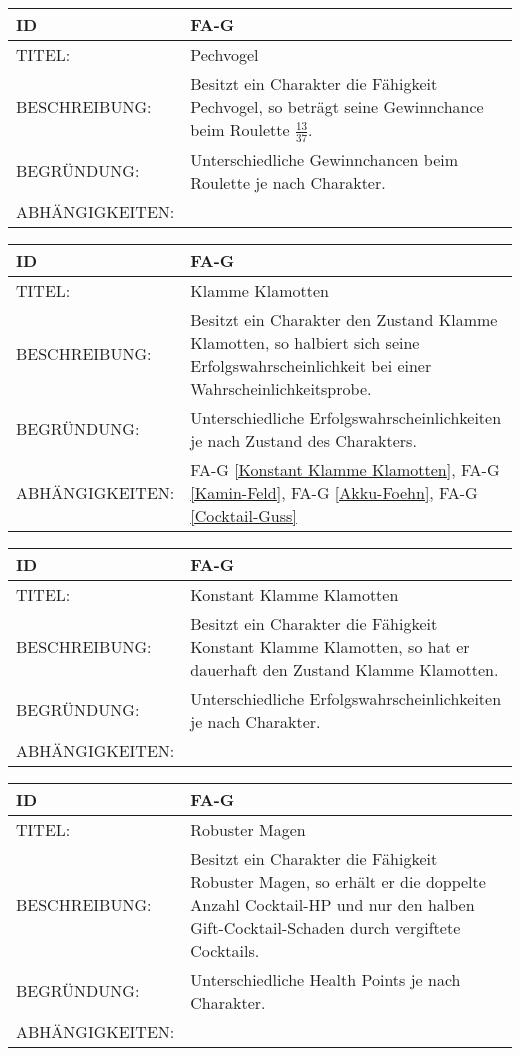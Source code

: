 \begin{tabularx}{16cm}{l|X}
	{table}\label{Pechvogel}
	\textbf{ID} & \textbf{FA-G \arabic{table}} \\
	\hline
	TITEL: & Pechvogel \\
	\hline
	BESCHREIBUNG: & Besitzt ein Charakter die Fähigkeit Pechvogel, so beträgt seine Gewinnchance beim Roulette $\frac{13}{37}$.\\
	\hline
	BEGRÜNDUNG: & Unterschiedliche Gewinnchancen beim Roulette je nach Charakter. \\
	\hline
	ABHÄNGIGKEITEN: &\\
\end{tabularx}

\begin{tabularx}{16cm}{l|X}
	{table}\label{Klamme Klamotten}
	\textbf{ID} & \textbf{FA-G \arabic{table}} \\
	\hline
	TITEL: & Klamme Klamotten \\
	\hline
	BESCHREIBUNG: & Besitzt ein Charakter den Zustand Klamme Klamotten, so halbiert sich seine Erfolgswahrscheinlichkeit bei einer Wahrscheinlichkeitsprobe. \\
	\hline
	BEGRÜNDUNG: & Unterschiedliche Erfolgswahrscheinlichkeiten je nach Zustand des Charakters.\\
	\hline
	ABHÄNGIGKEITEN: & FA-G \ref{Konstant Klamme Klamotten}, FA-G \ref{Kamin-Feld}, FA-G \ref{Akku-Foehn},  FA-G \ref{Cocktail-Guss}\\
\end{tabularx}

\begin{tabularx}{16cm}{l|X}
	{table}\label{Konstant Klamme Klamotten}
	\textbf{ID} & \textbf{FA-G \arabic{table}} \\
	\hline
	TITEL: & Konstant Klamme Klamotten \\
	\hline
	BESCHREIBUNG: & Besitzt ein Charakter die Fähigkeit Konstant Klamme Klamotten, so hat er dauerhaft den Zustand Klamme Klamotten.\\
	\hline
	BEGRÜNDUNG: & Unterschiedliche Erfolgswahrscheinlichkeiten je nach Charakter.\\
	\hline
	ABHÄNGIGKEITEN: & \\
\end{tabularx}

\begin{tabularx}{16cm}{l|X}
	{table}\label{Robuster Magen}
	\textbf{ID} & \textbf{FA-G \arabic{table}} \\
	\hline
	TITEL: & Robuster Magen \\
	\hline
	BESCHREIBUNG: & Besitzt ein Charakter die Fähigkeit Robuster Magen, so erhält er die doppelte Anzahl Cocktail-HP und nur den halben Gift-Cocktail-Schaden durch vergiftete Cocktails.\\
	\hline
	BEGRÜNDUNG: & Unterschiedliche Health Points je nach Charakter.\\
	\hline
	ABHÄNGIGKEITEN: & \\
\end{tabularx}

